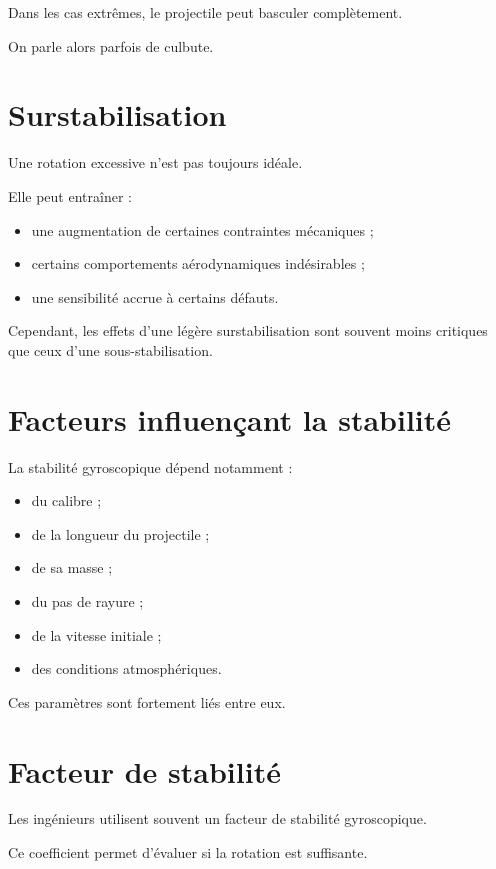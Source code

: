 Dans les cas extrêmes, le projectile peut basculer complètement.

On parle alors parfois de culbute.

\section{Surstabilisation}

Une rotation excessive n'est pas toujours idéale.

Elle peut entraîner :

\begin{itemize}
    \item une augmentation de certaines contraintes mécaniques ;
    \item certains comportements aérodynamiques indésirables ;
    \item une sensibilité accrue à certains défauts.
\end{itemize}

Cependant, les effets d'une légère surstabilisation sont souvent moins
critiques que ceux d'une sous-stabilisation.

\section{Facteurs influençant la stabilité}

La stabilité gyroscopique dépend notamment :

\begin{itemize}
    \item du calibre ;
    \item de la longueur du projectile ;
    \item de sa masse ;
    \item du pas de rayure ;
    \item de la vitesse initiale ;
    \item des conditions atmosphériques.
\end{itemize}

Ces paramètres sont fortement liés entre eux.

\section{Facteur de stabilité}

Les ingénieurs utilisent souvent un facteur de stabilité gyroscopique.

Ce coefficient permet d'évaluer si la rotation est suffisante.

